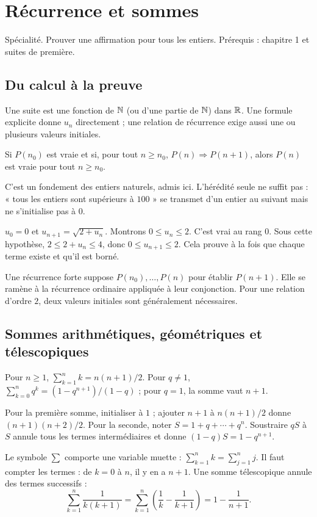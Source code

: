 \documentclass[../cours_tle.tex]{subfiles}
\begin{document}
\setcounter{chapter}{1}
\chapter{Récurrence et sommes}
\label{ch:2}
\begin{objectif}
Spécialité. Prouver une affirmation pour tous les entiers. Prérequis : chapitre 1 et suites de première.
\end{objectif}
\section{Du calcul à la preuve}
Une suite est une fonction de $\mathbb{N}$ (ou d'une partie de $\mathbb{N}$) dans $\mathbb{R}$. Une formule explicite donne $u_n$ directement ; une relation de récurrence exige aussi une ou plusieurs valeurs initiales.
\begin{theoreme}
Si $P(n_0)$ est vraie et si, pour tout $n\ge n_0$, $P(n)\Rightarrow P(n+1)$, alors $P(n)$ est vraie pour tout $n\ge n_0$.
\end{theoreme}
C'est un fondement des entiers naturels, admis ici. L'hérédité seule ne suffit pas : « tous les entiers sont supérieurs à $100$ » se transmet d'un entier au suivant mais ne s'initialise pas à $0$.
\begin{exemple}
$u_0=0$ et $u_{n+1}=\sqrt{2+u_n}$. Montrons $0\le u_n\le2$.
C'est vrai au rang $0$. Sous cette hypothèse, $2\le2+u_n\le4$, donc $0\le u_{n+1}\le2$.
Cela prouve à la fois que chaque terme existe et qu'il est borné.
\end{exemple}
Une récurrence forte suppose $P(n_0),\ldots,P(n)$ pour établir $P(n+1)$. Elle se ramène à la récurrence ordinaire appliquée à leur conjonction.
Pour une relation d'ordre $2$, deux valeurs initiales sont généralement nécessaires.
\section{Sommes arithmétiques, géométriques et télescopiques}
\begin{propriete}
Pour $n\ge1$, $\sum_{k=1}^n k=n(n+1)/2$. Pour $q\ne1$,
$\sum_{k=0}^n q^k=(1-q^{n+1})/(1-q)$ ; pour $q=1$, la somme vaut $n+1$.
\end{propriete}
\begin{demonstration}
Pour la première somme, initialiser à $1$ ; ajouter $n+1$ à $n(n+1)/2$ donne $(n+1)(n+2)/2$.
Pour la seconde, noter $S=1+q+\cdots+q^n$. Soustraire $qS$ à $S$ annule tous les termes intermédiaires et donne $(1-q)S=1-q^{n+1}$.
\end{demonstration}
Le symbole $\sum$ comporte une variable muette : $\sum_{k=1}^n k=\sum_{j=1}^n j$. Il faut compter les termes : de $k=0$ à $n$, il y en a $n+1$.
Une somme télescopique annule des termes successifs :
\[
\sum_{k=1}^n\frac1{k(k+1)}=\sum_{k=1}^n\left(\frac1k-\frac1{k+1}\right)=1-\frac1{n+1}.
\]
\end{document}
